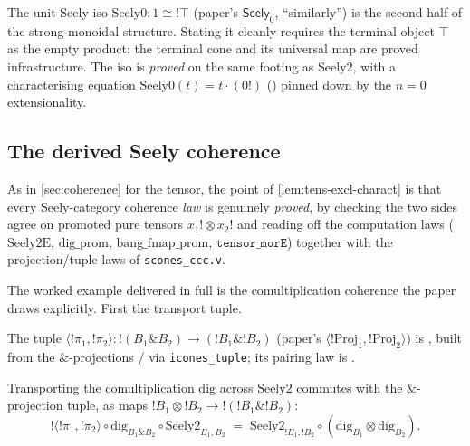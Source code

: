 \begin{remark}
The unit Seely iso $\mathrm{Seely0} : 1 \cong \mathord{!}\top$ (paper's
$\textsf{Seely}_0$, ``similarly'') is the second half of the strong-monoidal
structure. Stating it cleanly requires the terminal object $\top$ as the
empty product; the terminal cone
\rocqok{} and its universal map
\rocqok{} are proved
infrastructure. The iso
\rocqok{} is \emph{proved} on the
same footing as $\mathrm{Seely2}$, with a characterising equation
$\mathrm{Seely0}(t) = t \cdot (0!)$
(\rocqok{}) pinned down by
the $n = 0$ extensionality.
\end{remark}

\subsection{The derived Seely coherence}\label{sec:seely-coherence}

As in \autoref{sec:coherence} for the tensor, the point of
\autoref{lem:tens-excl-charact} is that every Seely-category coherence
\emph{law} is genuinely \emph{proved}, by checking the two sides agree on
promoted pure tensors $x_1! \otimes x_2!$ and reading off the
computation laws
($\mathrm{Seely2E}$, $\mathrm{dig\_prom}$, $\mathrm{bang\_fmap\_prom}$,
$\texttt{tensor\_morE}$) together with the projection/tuple laws of
\texttt{scones\_ccc.v}.

The worked example delivered in full is the comultiplication coherence
the paper draws explicitly. First the transport tuple.

\begin{definition}\label{def:bang-proj-tuple}
\rocqok
{}
The tuple $\langle \mathord{!}\pi_1, \mathord{!}\pi_2 \rangle :
\mathord{!}(B_1 \mathbin{\&} B_2) \to (\mathord{!}B_1 \mathbin{\&}
\mathord{!}B_2)$ (paper's $\langle \mathord{!}\mathrm{Proj}_1,
\mathord{!}\mathrm{Proj}_2 \rangle$) is
, built from the
$\mathbin{\&}$-projections  /
 via \texttt{icones\_tuple}; its
pairing law is .
\end{definition}

\begin{lemma}\label{lem:seely-comult}
\rocqok
{}
Transporting the comultiplication $\mathrm{dig}$ across
$\mathrm{Seely2}$ commutes with the $\mathbin{\&}$-projection tuple, as
maps $\mathord{!}B_1 \otimes \mathord{!}B_2 \to \mathord{!}(\mathord{!}B_1
\mathbin{\&} \mathord{!}B_2)$:
\[
  \mathord{!}\langle \mathord{!}\pi_1, \mathord{!}\pi_2 \rangle \circ
  \mathrm{dig}_{B_1 \mathbin{\&} B_2} \circ \mathrm{Seely2}_{B_1,B_2}
  \;=\;
  \mathrm{Seely2}_{\mathord{!}B_1,\mathord{!}B_2} \circ
  (\mathrm{dig}_{B_1} \otimes \mathrm{dig}_{B_2}).
\]
\end{lemma}

